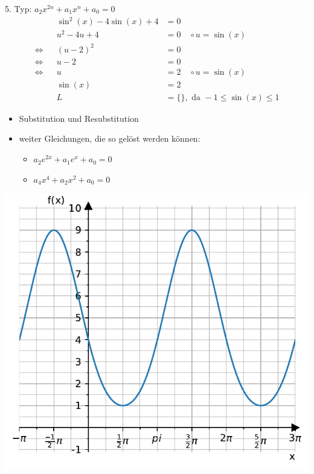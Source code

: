 \documentclass[
  ignorenonframetext,
  aspectratio=169,
]{beamer}
\providecommand{\tightlist}{%
  \setlength{\itemsep}{0pt}\setlength{\parskip}{0pt}}\usepackage{longtable,booktabs,array}
\begin{document}
\begin{frame}
\begin{block}{5. Typ: \(a_2 x^{2n}+ a_1 x^n + a_0=0\)}
\label{typ-a_2-x2n-a_1-xn-a_00}
\[ \begin{aligned}
  && \sin^2(x) -4\sin(x) +4 &= 0\\
  && u^2-4u+4 &=0 \quad \circ u=\sin(x)\\ 
  \Leftrightarrow&& (u-2)^2 &=0\\
  \Leftrightarrow&& u-2 &=0\\
  \Leftrightarrow&& u &=2 \quad \circ u=\sin(x)\\ 
  && \sin(x)&= 2\\
  &&L &= \{\}, \text{ da } -1 \leq \sin(x) \leq 1
\end{aligned}
\]

\begin{itemize}
\tightlist
\item
  Substitution und Resubstitution
\item
  weiter Gleichungen, die so gelöst werden können:

  \begin{itemize}
  \tightlist
  \item
    \(a_2e^{2x}+a_1 e^x+ a_0 = 0\)
  \item
    \(a_4x^4 + a_2x^2 + a_0 = 0\)
  \end{itemize}
\end{itemize}
\end{block}
\end{frame}

\begin{frame}
\includegraphics{3_Gleichungen_files/figure-beamer/cell-6-output-1.pdf}
\end{frame}
\end{document}
